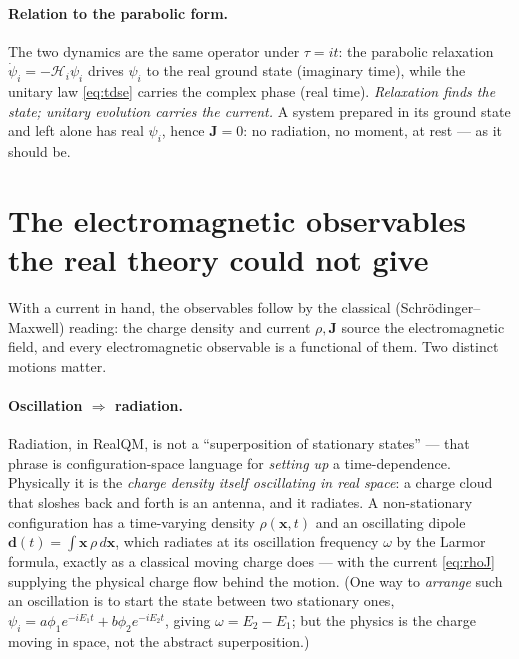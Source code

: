 \documentclass[11pt]{article}
\begin{document}
\paragraph{Relation to the parabolic form.} The two dynamics are the same operator under
$\tau=it$: the parabolic relaxation $\dot\psi_i=-\mathcal H_i\psi_i$ drives $\psi_i$ to the real ground
state (imaginary time), while the unitary law \eqref{eq:tdse} carries the complex phase (real time).
\emph{Relaxation finds the state; unitary evolution carries the current.} A system prepared in its ground
state and left alone has real $\psi_i$, hence $\mathbf J=0$: no radiation, no moment, at rest --- as it
should be.

\section{The electromagnetic observables the real theory could not give}
\label{sec:obs}

With a current in hand, the observables follow by the classical (Schr\"odinger--Maxwell) reading: the
charge density and current $\rho,\mathbf J$ source the electromagnetic field, and every electromagnetic
observable is a functional of them. Two distinct motions matter.

\paragraph{Oscillation $\Rightarrow$ radiation.} Radiation, in RealQM, is not a ``superposition of
stationary states'' --- that phrase is configuration-space language for \emph{setting up} a
time-dependence. Physically it is the \emph{charge density itself oscillating in real space}: a charge
cloud that sloshes back and forth is an antenna, and it radiates. A non-stationary configuration has a
time-varying density $\rho(\mathbf x,t)$ and an oscillating dipole
$\mathbf d(t)=\int\mathbf x\,\rho\,d\mathbf x$, which radiates at its oscillation frequency $\omega$ by
the Larmor formula, exactly as a classical moving charge does --- with the current \eqref{eq:rhoJ}
supplying the physical charge flow behind the motion. (One way to \emph{arrange} such an oscillation is to
start the state between two stationary ones, $\psi_i = a\phi_1 e^{-iE_1t}+b\phi_2 e^{-iE_2t}$, giving
$\omega=E_2-E_1$; but the physics is the charge moving in space, not the abstract superposition.)
\end{document}
